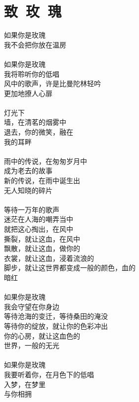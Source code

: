 \chapter[致玫瑰]{致~玫~瑰}

\leftskip=20mm
\noindent
如果你是玫瑰 \\
我不会把你放在温房 \\
\\
如果你是玫瑰 \\
我将聆听你的低唱 \\
风中的歌声，许是比曼陀林轻吟 \\
更加地撩人心扉 \\
\\
灯光下 \\
墙，在清茗的烟雾中 \\
退去，你的微笑，融在 \\
我的耳畔 \\
\\
雨中的传说，在匆匆岁月中 \\
成为老去的故事 \\
新的传说，在雨中诞生出 \\
无人知晓的碎片 \\
\\
等待一万年的歌声 \\
迷茫在人海的嘲弄当中 \\
就把这心掏出，在风中 \\
撕裂，就让这血，在风中 \\
飘散，就让这血，做你的 \\
衣裳，就让这血，浸着流浪的 \\
脚步，就让这世界都变成一般的颜色，血的 \\
暗红 \\
\\
如果你是玫瑰 \\
我会守望在你身边 \\
等待沧海的变迁，等待桑田的淹没 \\
等待你的绽放，就让你的色彩冲出 \\
你的心房，就让这血色的 \\
世界，一般的无光 \\
\\
如果你是玫瑰 \\
我要听着你，在月色下的低唱 \\
入梦，在梦里 \\
与你相拥
